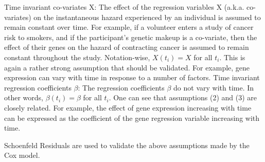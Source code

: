 \documentclass[11pt]{article} %
\begin{document}
Time invariant co-variates X: The effect of the regression variables X (a.k.a. co-variates) on the instantaneous hazard experienced by an individual is assumed to remain constant over time. For example, if a volunteer enters a study of cancer risk to smokers, and if the participant’s genetic makeup is a co-variate, then the effect of their genes on the hazard of contracting cancer is assumed to remain constant throughout the study. Notation-wise, $X(t_i)=X$ for all $t_i$. This is again a rather strong assumption that should be validated. For example, gene expression can vary with time in response to a number of factors.
Time invariant regression coefficients $\beta$: The regression coefficients $\beta$ do not vary with time. In other words, $\beta(t_i) = \beta$ for all $t_i$. One can see that assumptions (2) and (3) are closely related. For example, the effect of gene expression increasing with time can be expressed as the coefficient of the gene regression variable increasing with time.

Schoenfeld Residuals are used to validate the above assumptions made by the Cox model.
\end{document}
